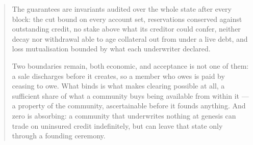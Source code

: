 \begin{abstract}
The guarantees are invariants audited over the whole state after every block: the cut
bound on every account set, reservations conserved against outstanding credit, no stake
above what its creditor could confer, neither decay nor withdrawal able to age collateral
out from under a live debt, and loss mutualisation bounded by what each underwriter
declared.

Two boundaries remain, both economic, and acceptance is not one of them: a sale
discharges before it creates, so a member who owes is paid by ceasing to owe. What binds
is what makes clearing possible at all, a sufficient share of what a community buys being
available from within it --- a property of the community, ascertainable before it founds
anything. And zero is absorbing: a community that underwrites nothing at genesis can trade
on uninsured credit indefinitely, but can leave that state only through a founding
ceremony.
\end{abstract}
\vspace{1em}
